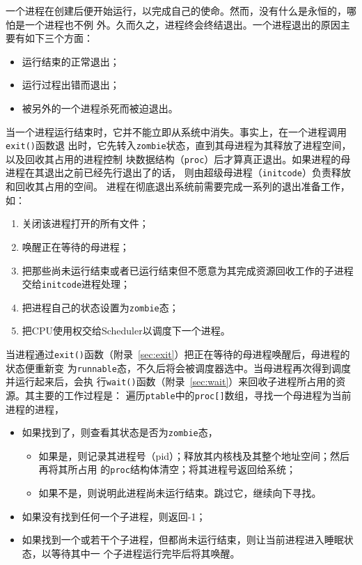 \documentclass{swfcthesismscctex}
\begin{document}
一个进程在创建后便开始运行，以完成自己的使命。然而，没有什么是永恒的，哪怕是一个进程也不例
外。久而久之，进程终会终结退出。一个进程退出的原因主要有如下三个方面：
\begin{itemize}
\item 运行结束的正常退出；
\item 运行过程出错而退出；
\item 被另外的一个进程杀死而被迫退出。
\end{itemize}

当一个进程运行结束时，它并不能立即从系统中消失。事实上，在一个进程调用\texttt{exit()}函数退
出时，它先转入\texttt{zombie}状态，直到其母进程为其释放了进程空间，以及回收其占用的进程控制
块数据结构（\texttt{proc}）后才算真正退出。如果进程的母进程在其退出之前已经先行退出了的话，
则由超级母进程（\texttt{initcode}）负责释放和回收其占用的空间\cite{ArpaciDusseau14-Book}。
进程在彻底退出系统前需要完成一系列的退出准备工作\cite{mauerer2008professional}，如：
\begin{enumerate}
\item 关闭该进程打开的所有文件；
\item 唤醒正在等待的母进程；
\item 把那些尚未运行结束或者已运行结束但不愿意为其完成资源回收工作的子进程交给\texttt{initcode}进程处理；
\item 把进程自己的状态设置为\texttt{zombie}态；
\item 把CPU使用权交给Scheduler以调度下一个进程。
\end{enumerate}

当进程通过\texttt{exit()}函数（附录~\ref{sec:exit}）把正在等待的母进程唤醒后，母进程的状态便重新变
为\texttt{runnable}态，不久后将会被调度器选中。当母进程再次得到调度并运行起来后，会执
行\texttt{wait()}函数（附录~\ref{sec:wait}）来回收子进程所占用的资源。其主要的工作过程是：
遍历\texttt{ptable}中的\texttt{proc[]}数组，寻找一个母进程为当前进程的进程，
\begin{itemize}
\item 如果找到了，则查看其状态是否为\texttt{zombie}态，
  \begin{itemize}
  \item 如果是，则记录其进程号（pid）；释放其内核栈及其整个地址空间；然后再将其所占用
    的\texttt{proc}结构体清空；将其进程号返回给系统；
  \item 如果不是，则说明此进程尚未运行结束。跳过它，继续向下寻找。
  \end{itemize}    
\item 如果没有找到任何一个子进程，则返回-1；
\item 如果找到一个或若干个子进程，但都尚未运行结束，则让当前进程进入睡眠状态，以等待其中一
  个子进程运行完毕后将其唤醒。
\end{itemize}
\end{document}
